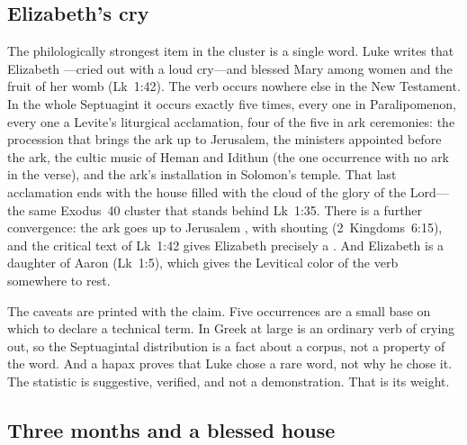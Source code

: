 \subsection{Elizabeth's cry}

The philologically strongest item in the cluster is a single word. Luke
writes that Elizabeth ---cried out with a
loud cry---and blessed Mary among women and the fruit of her womb
(Lk~1:42). The verb  occurs nowhere else in the New
Testament. In the whole Septuagint it occurs exactly five times, every
one in Paralipomenon, every one a Levite's liturgical acclamation, four
of the five in ark ceremonies: the procession that brings the ark up to
Jerusalem, the ministers appointed before the ark, the cultic music of
Heman and Idithun (the one occurrence with no ark in the verse), and the
ark's installation in Solomon's temple. That last acclamation ends with
the house filled with the cloud of the glory of the Lord---the same
Exodus~40 cluster that stands behind Lk~1:35. There is a further convergence: the ark goes up to Jerusalem
, with shouting (2~Kingdoms~6:15), and the critical
text of Lk~1:42 gives Elizabeth precisely a . And Elizabeth is
a daughter of Aaron (Lk~1:5), which gives the Levitical color of the verb
somewhere to rest.

The caveats are printed with the claim. Five occurrences are a small base
on which to declare a technical term. In Greek at large 
is an ordinary verb of crying out, so the Septuagintal distribution is a
fact about a corpus, not a property of the word. And a hapax proves that
Luke chose a rare word, not why he chose it. The statistic is suggestive,
verified, and not a demonstration. That is its weight.

\subsection{Three months and a blessed house}

